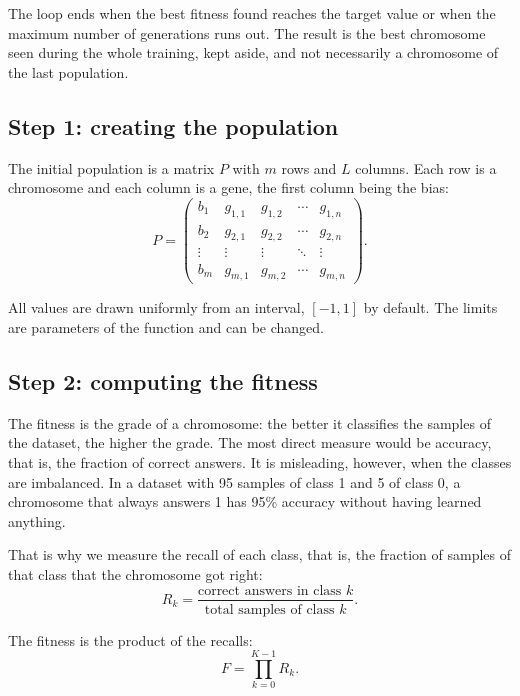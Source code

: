 \documentclass[11pt,a4paper]{article}
\begin{document}
\medskip
The loop ends when the best fitness found reaches the target value or when the
maximum number of generations runs out. The result is the best chromosome seen during
the whole training, kept aside, and not necessarily a chromosome of the last
population.

\subsection*{Step 1: creating the population}

The initial population is a matrix $P$ with $m$ rows and $L$ columns. Each row is a
chromosome and each column is a gene, the first column being the bias:
\begin{equation}
  P =
  \begin{pmatrix}
    b_1    & g_{1,1} & g_{1,2} & \cdots & g_{1,n} \\
    b_2    & g_{2,1} & g_{2,2} & \cdots & g_{2,n} \\
    \vdots & \vdots  & \vdots  & \ddots & \vdots  \\
    b_m    & g_{m,1} & g_{m,2} & \cdots & g_{m,n}
  \end{pmatrix}.
\end{equation}

All values are drawn uniformly from an interval, $[-1, 1]$ by default. The limits are
parameters of the function and can be changed.

\subsection*{Step 2: computing the fitness}

The fitness is the grade of a chromosome: the better it classifies the samples of the
dataset, the higher the grade. The most direct measure would be accuracy, that is,
the fraction of correct answers. It is misleading, however, when the classes are
imbalanced. In a dataset with 95 samples of class 1 and 5 of class 0, a chromosome
that always answers 1 has 95\% accuracy without having learned anything.

That is why we measure the recall of each class, that is, the fraction of samples of
that class that the chromosome got right:
\begin{equation}
  R_k = \frac{\text{correct answers in class } k}{\text{total samples of class } k}.
\end{equation}

The fitness is the product of the recalls:
\begin{equation}
  F = \prod_{k=0}^{K-1} R_k.
  \label{eq:fitness}
\end{equation}
\end{document}

